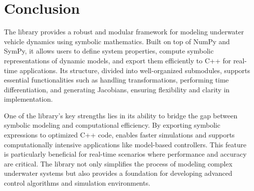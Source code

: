 \section{Conclusion}

The \pymuvs{} library provides a robust and modular framework for modeling 
underwater vehicle dynamics using symbolic mathematics. Built on top of NumPy 
and SymPy, it allows users to define system properties, compute symbolic 
representations of dynamic models, and export them efficiently to C++ for 
real-time applications. Its structure, divided into well-organized submodules, 
supports essential functionalities such as handling transformations, performing 
time differentiation, and generating Jacobians, ensuring flexibility and 
clarity in implementation.

One of the library's key strengths lies in its ability to bridge the gap 
between symbolic modeling and computational efficiency. By exporting symbolic 
expressions to optimized C++ code, \pymuvs{} enables faster simulations and 
supports computationally intensive applications like model-based controllers. 
This feature is particularly beneficial for real-time scenarios where 
performance and accuracy are critical. The library not only simplifies the 
process of modeling complex underwater systems but also provides a foundation 
for developing advanced control algorithms and simulation 
environments.
